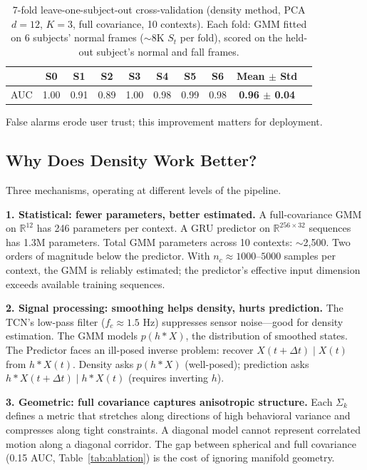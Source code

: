\documentclass[11pt,a4paper]{article}
\begin{document}
\begin{table}[H]
\centering
\caption{7-fold leave-one-subject-out cross-validation (density method, PCA $d{=}12$, $K{=}3$, full covariance, 10 contexts). Each fold: GMM fitted on 6 subjects' normal frames ($\sim$8K $S_t$ per fold), scored on the held-out subject's normal and fall frames.}
\label{tab:loso}
\begin{tabular}{lcccccccc|c}
\toprule
& \textbf{S0} & \textbf{S1} & \textbf{S2} & \textbf{S3} & \textbf{S4} & \textbf{S5} & \textbf{S6} & \textbf{Mean $\pm$ Std} \\
\midrule
AUC & 1.00 & 0.91 & 0.89 & 1.00 & 0.98 & 0.99 & 0.98 & \textbf{0.96 $\pm$ 0.04} \\
\bottomrule
\end{tabular}
\end{table}

False alarms erode user trust; this improvement matters for deployment.

\subsection{Why Does Density Work Better?}

Three mechanisms, operating at different levels of the pipeline.

\textbf{1. Statistical: fewer parameters, better estimated.}
A full-covariance GMM on $\mathbb{R}^{12}$ has 246 parameters per context. A GRU predictor on $\mathbb{R}^{256 \times 32}$ sequences has 1.3M parameters.
Total GMM parameters across 10 contexts: $\sim$2,500. Two orders of magnitude below the predictor.
With $n_c \approx 1000$--$5000$ samples per context, the GMM is reliably estimated; the predictor's effective input dimension exceeds available training sequences.

\textbf{2. Signal processing: smoothing helps density, hurts prediction.}
The TCN's low-pass filter ($f_c \approx 1.5$ Hz) suppresses sensor noise---good for density estimation.
The GMM models $p(h * X)$, the distribution of smoothed states.
The Predictor faces an ill-posed inverse problem: recover $X(t+\Delta t) \mid X(t)$ from $h * X(t)$.
Density asks $p(h * X)$ (well-posed); prediction asks $h * X(t+\Delta t) \mid h * X(t)$ (requires inverting $h$).

\textbf{3. Geometric: full covariance captures anisotropic structure.}
Each $\Sigma_k$ defines a metric that stretches along directions of high behavioral variance and compresses along tight constraints.
A diagonal model cannot represent correlated motion along a diagonal corridor.
The gap between spherical and full covariance (0.15 AUC, Table~\ref{tab:ablation}) is the cost of ignoring manifold geometry.
\end{document}

